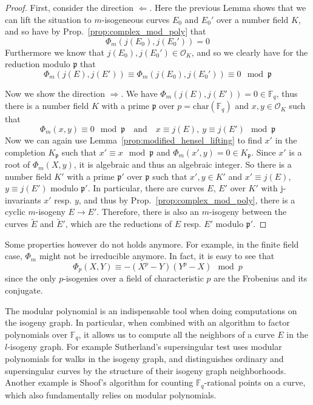 \documentclass{ociamthesis}
\newcommand{\F}{\mathbb{F}}
\newcommand{\p}{\mathfrak{p}}
\renewcommand{\O}{\mathcal{O}}
\theoremstyle{definition}
\begin{document}
\begin{proof}
    First, consider the direction $\Leftarrow$.
    Here the previous Lemma shows that we can lift the situation to $m$-isogeneous curves $E_0$ and $E_0'$ over a number field $K$, and so have by Prop.~\ref{prop:complex_mod_poly} that
    \begin{equation*}
        \Phi_m(j(E_0), j(E_0')) = 0
    \end{equation*}
    Furthermore we know that $j(E_0), j(E_0') \in \O_K$, and so we clearly have for the reduction modulo $\p$ that
    \begin{equation*}
        \Phi_m(j(E), j(E')) \equiv \Phi_m(j(E_0), j(E_0')) \equiv 0 \mod \p
    \end{equation*}

    Now we show the direction $\Rightarrow$.
    We have $\Phi_m(j(E), j(E')) = 0 \in \F_q$, thus there is a number field $K$ with a prime $\p$ over $p = \mathrm{char}(\F_q)$ and $x, y \in \O_K$ such that
    \begin{equation*}
        \Phi_m(x, y) \equiv 0 \mod \p \quad \text{and} \quad x \equiv j(E), \ y \equiv j(E') \mod \p
    \end{equation*}
    Now we can again use Lemma~\ref{prop:modified_hensel_lifting} to find $x'$ in the completion $K_\p$ such that $x' \equiv x \mod \p$ and $\Phi_m(x', y) = 0 \in K_\p$.
    Since $x'$ is a root of $\Phi_m(X, y)$, it is algebraic and thus an algebraic integer.
    So there is a number field $K'$ with a prime $\p'$ over $\p$ such that $x', y \in K'$ and $x' \equiv j(E)$, $y \equiv j(E')$ modulo $\p'$.
    In particular, there are curves $E$, $E'$ over $K'$ with j-invariants $x'$ resp. $y$, and thus by Prop.~\ref{prop:complex_mod_poly}, there is a cyclic $m$-isogeny $E \to E'$.
    Therefore, there is also an $m$-isogeny between the curves $\tilde{E}$ and $\tilde{E}'$, which are the reductions of $E$ resp. $E'$ modulo $\p'$.
\end{proof}
Some properties however do not holds anymore.
For example, in the finite field case, $\Phi_m$ might not be irreducible anymore.
In fact, it is easy to see that
\begin{equation*}
    \Phi_p(X, Y) \equiv -(X^p - Y)(Y^p - X) \mod p
\end{equation*}
since the only $p$-isogenies over a field of characteristic $p$ are the Frobenius and its conjugate.

The modular polynomial is an indispensable tool when doing computations on the isogeny graph.
In particular, when combined with an algorithm to factor polynomials over $\F_q$, it allows us to compute all the neighbors of a curve $E$ in the $l$-isogeny graph.
For example Sutherland's supersingular test \cite{sutherland_supersingularity_test} uses modular polynomials for walks in the isogeny graph, and distinguishes ordinary and supersingular curves by the structure of their isogeny graph neighborhoods.
Another example is Shoof's algorithm \cite{shoof_point_counting} for counting $\F_q$-rational points on a curve, which also fundamentally relies on modular polynomials.
\end{document}
